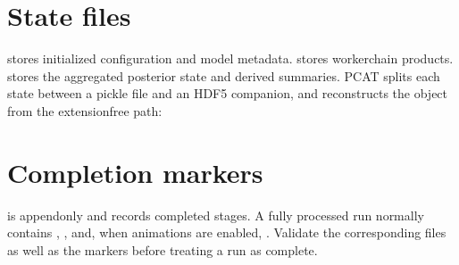 \documentclass[letterpaper,10pt,english]{sphinxmanual}
\begin{document}
\section{State files}
\label{\detokenize{outputs:state-files}}
\sphinxAtStartPar
{} stores initialized configuration and model metadata.
 stores worker\sphinxhyphen{}chain products.  stores the
aggregated posterior state and derived summaries. PCAT splits each state between
a pickle file and an HDF5 companion, and {\hyperref[\detokenize{api:pcat.main.readfile}]{}} reconstructs
the object from the extension\sphinxhyphen{}free path:

\begin{sphinxVerbatim}[commandchars=\\\{\}]
 

 

  
  
            
\end{sphinxVerbatim}


\section{Completion markers}
\label{\detokenize{outputs:completion-markers}}
\sphinxAtStartPar
{} is append\sphinxhyphen{}only and records completed stages. A fully processed run
normally contains , , and,
when animations are enabled, . Validate the corresponding
files as well as the markers before treating a run as complete.
\end{document}
